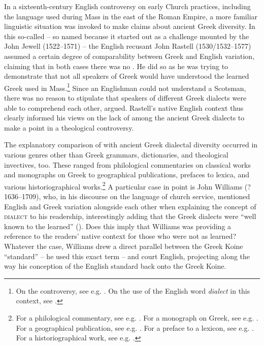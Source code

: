 In a sixteenth-century English controversy on early Church practices, including the language used during Mass in the east of the Roman Empire, a more familiar linguistic situation was invoked to make claims about ancient Greek diversity. In this so-called  – so named because it started out as a challenge mounted by the  John Jewell (1522–1571) – the English recusant John Rastell (1530/1532–1577) assumed a certain degree of comparability between Greek and English variation, claiming that in both cases there was no . He did so as he was trying to demonstrate that not all speakers of Greek would have understood the learned Greek used in Mass.\footnote{On the controversy, see e.g. \citet[115--154]{Jenkins2006}. On the use of the English word \textit{dialect} in this context, see \citet[647--651]{VanRooyConsidine2016}.} Since an Englishman could not understand a Scotsman, there was no reason to stipulate that speakers of different Greek dialects were able to comprehend each other, \citet[68\textsc{\textsuperscript{r}}]{Rastell1566} argued. Rastell’s native English context thus clearly informed his views on the lack of  among the ancient Greek dialects to make a point in a theological controversy.

The explanatory comparison of  with ancient Greek dialectal diversity occurred in various genres other than Greek grammars, dictionaries, and theological invectives, too. These ranged from philological commentaries on classical works and monographs on  Greek to geographical publications, prefaces to lexica, and various historiographical works.\footnote{For a philological commentary, see e.g. \citet[68; French–Greek comparison]{Casaubon1587}. For a monograph on  Greek, see e.g. \citet[212--213; also French–Greek]{Cottiere1646}. For a geographical publication, see e.g. \citet[60; English–Greek comparison]{Speed1676}. For a preface to a lexicon, see e.g. \citet[(b.3)\textsuperscript{v}\textsc{;} also English–Greek]{Phillips1658}. For a historiographical work, see e.g. \citet[108, 117; French/Italian–Greek comparison]{Freret1809}.} A particular case in point is John Williams (?1636–1709), who, in his discourse on the language of church service, mentioned English and Greek variation alongside each other when explaining the concept of \textsc{dialect} to his readership, interestingly adding that the Greek dialects were “well known to the learned” (\citeyear[5]{Williams1685}). Does this imply that Williams was providing a reference to the readers’ native context for those who were not as learned? Whatever the case, Williams drew a direct parallel between the Greek Koine “standard” – he used this exact term – and court English, projecting along the way his conception of the English standard back onto the Greek Koine.

